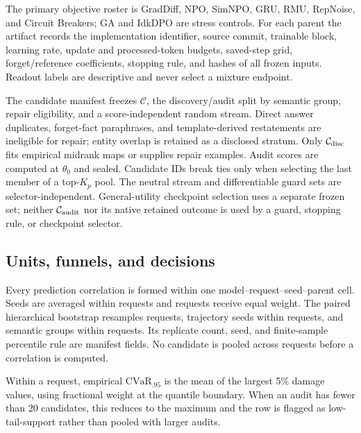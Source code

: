 The primary objective roster is GradDiff, NPO, SimNPO, GRU, RMU, RepNoise,
and Circuit Breakers; GA and IdkDPO are stress controls. For each parent the
artifact records the implementation identifier, source commit, trainable
block, learning rate, update and processed-token budgets, saved-step grid,
forget/reference coefficients, stopping rule, and hashes of all frozen
inputs. Readout labels are descriptive and never select a mixture endpoint.

The candidate manifest freezes $\mathcal C$, the discovery/audit split by
semantic group, repair eligibility, and a score-independent random stream. Direct
answer duplicates, forget-fact paraphrases, and template-derived restatements
are ineligible for repair; entity overlap is retained as a disclosed stratum.
Only $\mathcal C_{\rm disc}$ fits empirical midrank maps or supplies repair
examples. Audit scores are computed at $\theta_0$ and sealed. Candidate IDs
break ties only when selecting the last member of a top-$K_p$ pool.
The neutral stream and differentiable guard sets are selector-independent.
General-utility checkpoint selection uses a separate frozen set; neither
$\mathcal C_{\rm audit}$ nor its native retained outcome is used by a guard,
stopping rule, or checkpoint selector.

\subsection{Units, funnels, and decisions}
\label{app:outcomes}

Every prediction correlation is formed within one
model--request--seed--parent cell. Seeds are averaged within requests and
requests receive equal weight. The paired hierarchical bootstrap resamples
requests, trajectory seeds within requests, and semantic groups within
requests. Its replicate count, seed, and
finite-sample percentile rule are manifest fields. No candidate is pooled
across requests before a correlation is computed.

Within a request, empirical $\mathrm{CVaR}_{.95}$ is the mean of the largest
5\% damage values, using fractional weight at the quantile boundary. When an
audit has fewer than 20 candidates, this reduces to the maximum and the row is
flagged as low-tail-support rather than pooled with larger audits.

